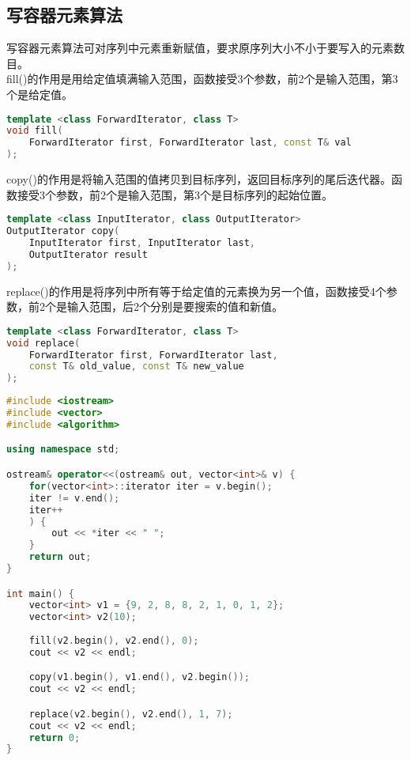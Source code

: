 \vspace{0.5cm}

\subsection{写容器元素算法}

写容器元素算法可对序列中元素重新赋值，要求原序列大小不小于要写入的元素数目。\\

fill()的作用是用给定值填满输入范围，函数接受3个参数，前2个是输入范围，第3个是给定值。

\vspace{-0.5cm}

\begin{lstlisting}[language=C++]
template <class ForwardIterator, class T>
void fill(
	ForwardIterator first, ForwardIterator last, const T& val
);
\end{lstlisting}

copy()的作用是将输入范围的值拷贝到目标序列，返回目标序列的尾后迭代器。函数接受3个参数，前2个是输入范围，第3个是目标序列的起始位置。

\vspace{-0.5cm}

\begin{lstlisting}[language=C++]
template <class InputIterator, class OutputIterator>
OutputIterator copy(
	InputIterator first, InputIterator last,
	OutputIterator result
);
\end{lstlisting}

replace()的作用是将序列中所有等于给定值的元素换为另一个值，函数接受4个参数，前2个是输入范围，后2个分别是要搜索的值和新值。

\vspace{-0.5cm}

\begin{lstlisting}[language=C++]
template <class ForwardIterator, class T>
void replace(
	ForwardIterator first, ForwardIterator last, 
	const T& old_value, const T& new_value
);
\end{lstlisting}

\vspace{0.5cm}


\begin{lstlisting}[language=C++]
#include <iostream>
#include <vector>
#include <algorithm>

using namespace std;

ostream& operator<<(ostream& out, vector<int>& v) {
	for(vector<int>::iterator iter = v.begin(); 
	iter != v.end(); 
	iter++
	) {
		out << *iter << " ";
	}
	return out;
}

int main() {
	vector<int> v1 = {9, 2, 8, 8, 2, 1, 0, 1, 2};
	vector<int> v2(10);
	
	fill(v2.begin(), v2.end(), 0);
	cout << v2 << endl;

	copy(v1.begin(), v1.end(), v2.begin());
	cout << v2 << endl;

	replace(v2.begin(), v2.end(), 1, 7);
	cout << v2 << endl;
	return 0;
}
\end{lstlisting}

